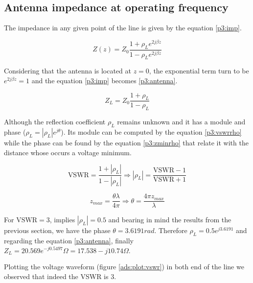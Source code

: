 \subsection{Antenna impedance at operating frequency}

The impedance in any given point of the line is given by the equation \ref{p3:imp}.

\begin{equation} \label{p3:imp}
    Z(z) = Z_0 \frac{1+\rho_L e^{2j \beta z}}{1 -\rho_L e^{2j \beta z}}
\end{equation}

Considering that the antenna is located at $z=0$, the exponential term turn to be $e^{2j \beta z}=1$ and the equation \ref{p3:imp} becomes \ref{p3:antenna}.

\begin{equation} \label{p3:antenna}
    Z_L = Z_0 \frac{1+\rho_L}{1 -\rho_L}
\end{equation}

Although the reflection coefficient $\rho_L$ remains unknown and it has a module and phase ($\rho_L = |\rho_L| e^{j\theta}$). Its module can be computed by the equation \ref{p3:vswrrho} while the phase can be found by the equation \ref{p3:zminrho} that relate it with the distance whose occurs a voltage minimum.

\begin{equation} \label{p3:vswrrho}
    \text{VSWR} = \frac{1+|\rho_L|}{1-|\rho_L|} \Rightarrow |\rho_L| = \frac{\text{VSWR}-1}{\text{VSWR}+1}
\end{equation}

\begin{equation} \label{p3:zminrho}
    z_{max} = \frac{\theta \lambda}{4\pi} \Rightarrow \theta = \frac{4 \pi z_{max}}{\lambda}
\end{equation}

For $\text{VSWR}=3$, implies $|\rho_L|=0.5$ and bearing in mind the results from the previous section, we have the phase $\theta = 3.6191 rad$. Therefore $\rho_L = 0.5 e^{j3.6191}$ and regarding the equation \ref{p3:antenna}, finally $Z_L = 20.569 e^{-j0.5497} \Omega = 17.538 - j10.74 \Omega$.

Plotting the voltage waveform (figure \ref{ads:plot:vswr}) in both end of the line we observed that indeed the VSWR is 3.

